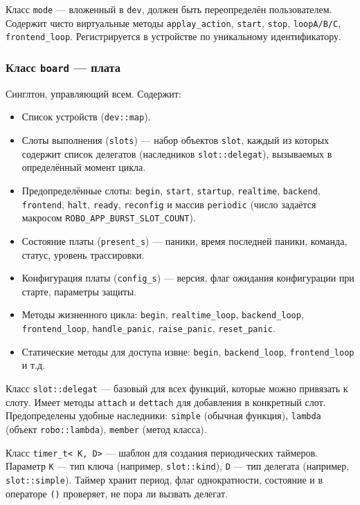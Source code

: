 \documentclass[a4paper,12pt]{article}
\begin{document}
Класс \texttt{mode} — вложенный в \texttt{dev}, должен быть переопределён пользователем. Содержит чисто виртуальные методы \texttt{applay\_action}, \texttt{start}, \texttt{stop}, \texttt{loopA/B/C}, \texttt{frontend\_loop}. Регистрируется в устройстве по уникальному идентификатору.

\subsubsection{Класс \texttt{board} — плата}

Синглтон, управляющий всем. Содержит:

\begin{itemize}
    \item Список устройств (\texttt{dev::map}).
    \item Слоты выполнения (\texttt{slots}) — набор объектов \texttt{slot}, каждый из которых содержит список делегатов (наследников \texttt{slot::delegat}), вызываемых в определённый момент цикла.
    \item Предопределённые слоты: \texttt{begin}, \texttt{start}, \texttt{startup}, \texttt{realtime}, \texttt{backend}, \texttt{frontend}, \texttt{halt}, \texttt{ready}, \texttt{reconfig} и массив \texttt{periodic} (число задаётся макросом \texttt{ROBO\_APP\_BURST\_SLOT\_COUNT}).
    \item Состояние платы (\texttt{present\_s}) — паники, время последней паники, команда, статус, уровень трассировки.
    \item Конфигурация платы (\texttt{config\_s}) — версия, флаг ожидания конфигурации при старте, параметры защиты.
    \item Методы жизненного цикла: \texttt{begin}, \texttt{realtime\_loop}, \texttt{backend\_loop}, \texttt{frontend\_loop}, \texttt{handle\_panic}, \texttt{raise\_panic}, \texttt{reset\_panic}.
    \item Статические методы для доступа извне: \texttt{begin}, \texttt{backend\_loop}, \texttt{frontend\_loop} и т.д.
\end{itemize}

Класс \texttt{slot::delegat} — базовый для всех функций, которые можно привязать к слоту. Имеет методы \texttt{attach} и \texttt{dettach} для добавления в конкретный слот. Предопределены удобные наследники: \texttt{simple} (обычная функция), \texttt{lambda} (объект \texttt{robo::lambda}), \texttt{member} (метод класса).

Класс \texttt{timer\_t< K, D>} — шаблон для создания периодических таймеров. Параметр \texttt{K} — тип ключа (например, \texttt{slot::kind}), \texttt{D} — тип делегата (например, \texttt{slot::simple}). Таймер хранит период, флаг однократности, состояние и в операторе \texttt{()} проверяет, не пора ли вызвать делегат.
\end{document}
